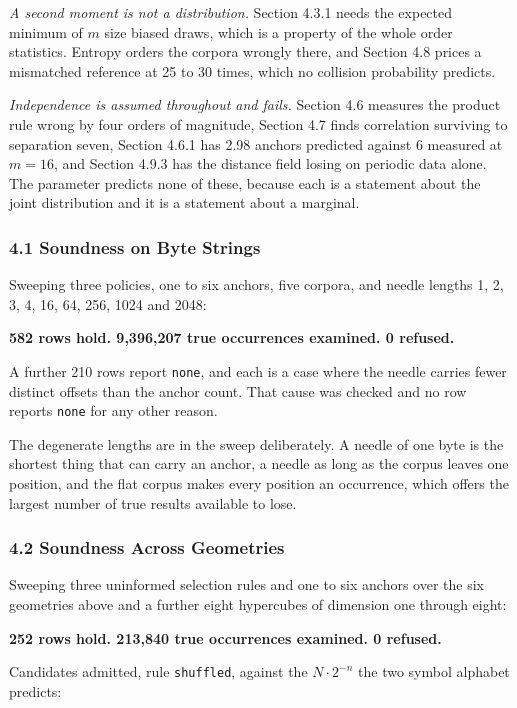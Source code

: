 \noindent\emph{A second moment is not a distribution.} Section 4.3.1 needs the expected minimum of \(m\) size biased draws, which is a property of the whole order statistics. Entropy orders the corpora wrongly there, and Section 4.8 prices a mismatched reference at 25 to 30 times, which no collision probability predicts.

\noindent\emph{Independence is assumed throughout and fails.} Section 4.6 measures the product rule wrong by four orders of magnitude, Section 4.7 finds correlation surviving to separation seven, Section 4.6.1 has 2.98 anchors predicted against 6 measured at \(m = 16\), and Section 4.9.3 has the distance field losing on periodic data alone. The parameter predicts none of these, because each is a statement about the joint distribution and it is a statement about a marginal.

\subsubsection{4.1 Soundness on Byte Strings}

Sweeping three policies, one to six anchors, five corpora, and needle lengths 1, 2, 3, 4, 16, 64, 256, 1024 and 2048:

\noindent\textbf{582 rows hold. 9,396,207 true occurrences examined. 0 refused.}

A further 210 rows report \texttt{none}, and each is a case where the needle carries fewer distinct offsets than the anchor count. That cause was checked and no row reports \texttt{none} for any other reason.

The degenerate lengths are in the sweep deliberately. A needle of one byte is the shortest thing that can carry an anchor, a needle as long as the corpus leaves one position, and the flat corpus makes every position an occurrence, which offers the largest number of true results available to lose.

\subsubsection{4.2 Soundness Across Geometries}

Sweeping three uninformed selection rules and one to six anchors over the six geometries above and a further eight hypercubes of dimension one through eight:

\noindent\textbf{252 rows hold. 213,840 true occurrences examined. 0 refused.}

Candidates admitted, rule \texttt{shuffled}, against the \(N \cdot 2^{-n}\) the two symbol alphabet predicts:

